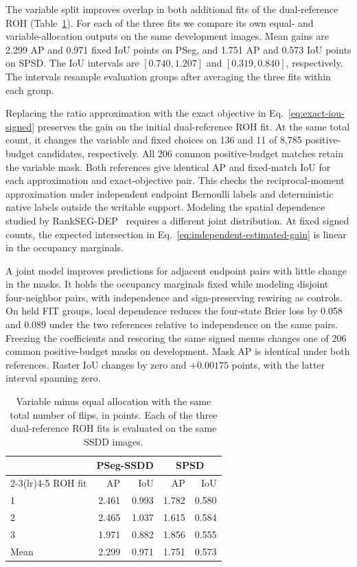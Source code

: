 \documentclass[journal]{IEEEtran}
\begin{document}
The variable split improves overlap in both additional fits of the dual-reference ROH (Table~\ref{tab:dual-sign-seeds}). For each of the three fits we compare its own equal- and variable-allocation outputs on the same development images. Mean gains are 2.299 AP and 0.971 fixed IoU points on PSeg, and 1.751 AP and 0.573 IoU points on SPSD. The IoU intervals are \([0.740,1.207]\) and \([0.319,0.840]\), respectively. The intervals resample evaluation groups after averaging the three fits within each group.

Replacing the ratio approximation with the exact objective in Eq.~\eqref{eq:exact-iou-signed} preserves the gain on the initial dual-reference ROH fit. At the same total count, it changes the variable and fixed choices on 136 and 11 of 8,785 positive-budget candidates, respectively. All 206 common positive-budget matches retain the variable mask. Both references give identical AP and fixed-match IoU for each approximation and exact-objective pair. This checks the reciprocal-moment approximation under independent endpoint Bernoulli labels and deterministic native labels outside the writable support. Modeling the spatial dependence studied by RankSEG-DEP~\cite{rankdep} requires a different joint distribution. At fixed signed counts, the expected intersection in Eq.~\eqref{eq:independent-estimated-gain} is linear in the occupancy marginals.

A joint model improves predictions for adjacent endpoint pairs with little change in the masks. It holds the occupancy marginals fixed while modeling disjoint four-neighbor pairs, with independence and sign-preserving rewiring as controls. On held FIT groups, local dependence reduces the four-state Brier loss by 0.058 and 0.089 under the two references relative to independence on the same pairs. Freezing the coefficients and rescoring the same signed menus changes one of 206 common positive-budget masks on development. Mask AP is identical under both references. Raster IoU changes by zero and \(+0.00175\) points, with the latter interval spanning zero.

\begin{table}[t]
\centering
\caption{Variable minus equal allocation with the same total number of flips, in points. Each of the three dual-reference ROH fits is evaluated on the same SSDD images.}
\label{tab:dual-sign-seeds}
\footnotesize
\begin{tabular}{@{}lrrrr@{}}
\toprule
 & \multicolumn{2}{c}{PSeg-SSDD} & \multicolumn{2}{c}{SPSD}\\
\cmidrule(lr){2-3}\cmidrule(lr){4-5}
ROH fit & AP & IoU & AP & IoU\\
\midrule
1 & 2.461 & 0.993 & 1.782 & 0.580\\
2 & 2.465 & 1.037 & 1.615 & 0.584\\
3 & 1.971 & 0.882 & 1.856 & 0.555\\
\midrule
Mean & 2.299 & 0.971 & 1.751 & 0.573\\
\bottomrule
\end{tabular}
\end{table}
\end{document}
